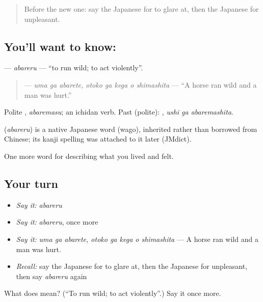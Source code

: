 \label{lesson:JA-C430-abareru}



\begin{quote}
Before the new one: say the Japanese for to glare at, then the Japanese for unpleasant.
\end{quote}

\subsection*{You'll want to know: }
\textbf{} — \emph{abareru} — \textquotedblleft{}to run wild; to act violently\textquotedblright{}.

\begin{quote}
\textbf{   } — \emph{uma ga abarete, otoko ga kega o shimashita} — \textquotedblleft{}A horse ran wild and a man was hurt.\textquotedblright{}
\end{quote}

Polite \textbf{}, \emph{abaremasu}; an ichidan verb. Past (polite): \textbf{ }, \emph{ushi ga abaremashita}.

\begin{cousinweb}
\textbf{} (\emph{abareru}) is a native Japanese word (wago), inherited rather than borrowed from Chinese; its kanji spelling was attached to it later (JMdict).
\end{cousinweb}

\begin{grammarlens}[title={What you've built}]
One more word for describing what you lived and felt.
\end{grammarlens}

\subsection*{Your turn}
\begin{itemize}
\raggedright
  \item \emph{Say it:} \emph{abareru}
  \item \emph{Say it:} \emph{abareru}, once more
  \item \emph{Say it:} \emph{uma ga abarete, otoko ga kega o shimashita} — A horse ran wild and a man was hurt.
  \item \emph{Recall:} say the Japanese for to glare at, then the Japanese for unpleasant, then say \emph{abareru} again
\end{itemize}

\begin{tcolorbox}[breakable,colback=teal!4,colframe=teal!35!black,title={Before you move on}]
What does  mean? (\textquotedblleft{}To run wild; to act violently\textquotedblright{}.) Say it once more.
\end{tcolorbox}
